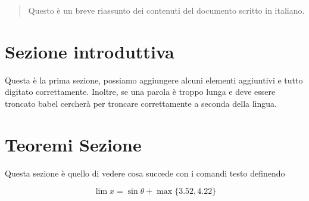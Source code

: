 \documentclass{article}
\begin{document}
\tableofcontents

\vspace{2cm} %

\begin{abstract}
Questo è un breve riassunto dei contenuti del 
documento scritto in italiano.
\end{abstract}

\section{Sezione introduttiva}
Questa è la prima sezione, possiamo aggiungere 
alcuni elementi aggiuntivi e tutto 
digitato correttamente. Inoltre, se una parola 
è troppo lunga e deve essere troncato 
babel cercherà per troncare correttamente 
a seconda della lingua.

\section{Teoremi Sezione}
Questa sezione è quello di vedere cosa succede con i comandi 
testo definendo

\[ \lim x =  \sin{\theta} + \max \{3.52, 4.22\} \]
\end{document}
